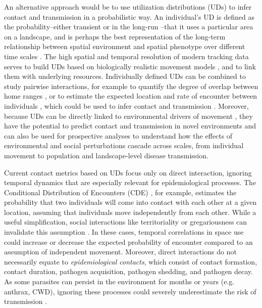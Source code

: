 \documentclass[letterpaper]{article}
\begin{document}
An alternative approach would be to use utilization distributions (UDs) to infer contact and transmission in a probabilistic way. An individual's UD is defined as the probability--either transient or in the long-run \citep{Tao2016}--that it uses a particular area on a landscape, and is perhaps the best representation of the long-term relationship between spatial environment and spatial phenotype over different time scales \citet{Webber2023}. The high spatial and temporal resolution of modern tracking data serves to build UDs based on biologically realistic movement models \citep{Fleming2014,Gurarie2011,Potts2023}, and to link them with underlying resources.
Individually defined UDs can be combined to study pairwise interactions, for example to quantify the degree of overlap between home ranges \citep{Winner2018}, or to estimate the expected location and rate of encounter between individuals  \citep{Noonan2021}, which could be used to infer contact and transmission \citep{Godfrey2010, Godfrey2013}. 
Moreover, because UDs can be directly linked to environmental drivers of movement \citep{Signer2017}, they have the potential to predict contact and transmission in novel environments and can also be used for prospective analyses to understand how the effects of environmental and social perturbations cascade across scales, from individual movement to population and landscape-level disease transmission. 

Current contact metrics based on UDs focus only on direct interaction, ignoring temporal dynamics that are especially relevant for epidemiological processes. The Conditional Distribution of Encounters (CDE) \citep{Noonan2021}, for example, estimates the probability that two individuals will come into contact with each other at a given location, assuming that individuals move independently from each other.
While a useful simplification, social interactions like territoriality or gregariousness can invalidate this assumption  \citep{Manlove2018,Sah2018}. In these cases, temporal correlations in space use could increase or decrease the expected probability of encounter compared to an assumption of independent movement. 
Moreover, direct interactions do not necessarily equate to \emph{epidemiological contacts}, which consist of contact formation, contact duration, pathogen acquisition, pathogen shedding, and pathogen decay. As some parasites can persist in the environment for months or years (e.g. anthrax, CWD), ignoring these processes could severely underestimate the risk of transmission \citep{Wilber2022,Yang2023,Richardson2015}.
\end{document}
